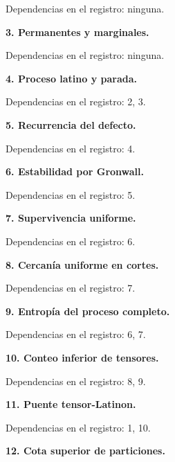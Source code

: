 \documentclass[spanish,11pt,a4paper]{article}
\begin{document}
Dependencias en el registro: ninguna.

\textbf{3. Permanentes y marginales.}


Dependencias en el registro: ninguna.

\textbf{4. Proceso latino y parada.}


Dependencias en el registro: 2, 3.

\textbf{5. Recurrencia del defecto.}


Dependencias en el registro: 4.

\textbf{6. Estabilidad por Gronwall.}


Dependencias en el registro: 5.

\textbf{7. Supervivencia uniforme.}


Dependencias en el registro: 6.

\textbf{8. Cercanía uniforme en cortes.}


Dependencias en el registro: 7.

\textbf{9. Entropía del proceso completo.}


Dependencias en el registro: 6, 7.

\textbf{10. Conteo inferior de tensores.}


Dependencias en el registro: 8, 9.

\textbf{11. Puente tensor-Latinon.}


Dependencias en el registro: 1, 10.

\textbf{12. Cota superior de particiones.}
\end{document}
